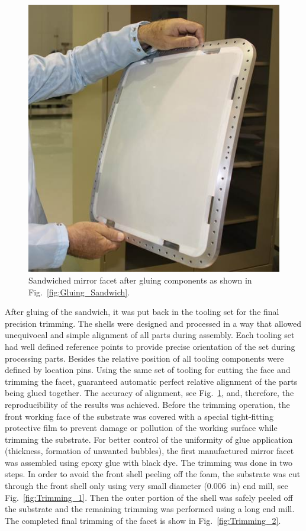 \begin{figure}[ht]
    \centering
    \includegraphics[width=0.9\linewidth]{images/Assembled_Sandwich.jpg}
    \caption{Sandwiched mirror facet after gluing components as shown in Fig.~\ref{fig:Gluing_Sandwich}.}
    \label{fig:Assembled_Sandwich}
\end{figure}

After gluing of the sandwich, it was put back in the tooling set for the final precision trimming. The shells were
designed and processed in a way that allowed  unequivocal and simple alignment of all parts during assembly. Each tooling set had well defined reference points to provide precise orientation of the set during processing parts. Besides the relative position of all tooling components were defined by location pins. Using
the same set of tooling for cutting the face and trimming the facet, guaranteed automatic perfect relative
alignment of the parts being glued together. The accuracy of alignment, see Fig.~\ref{fig:Assembled_Sandwich},
and, therefore, the reproducibility of the results was achieved. Before the trimming operation, the front working
face of the substrate was covered with a special tight-fitting protective film to prevent damage or pollution of the
working surface while trimming the substrate. For better control of the uniformity of glue application (thickness,
formation of unwanted bubbles), the first manufactured mirror facet was assembled using epoxy glue with black
dye. The trimming was done in two steps. In order to avoid the front shell peeling off the foam, the substrate  was
cut through the front shell only using very small diameter (0.006~in) end mill, see Fig.~\ref{fig:Trimming_1}. Then
the outer portion of the shell was safely peeled off the substrate and the remaining trimming was performed using
a long end mill. The completed final trimming of the facet is show in Fig.~\ref{fig:Trimming_2}.

